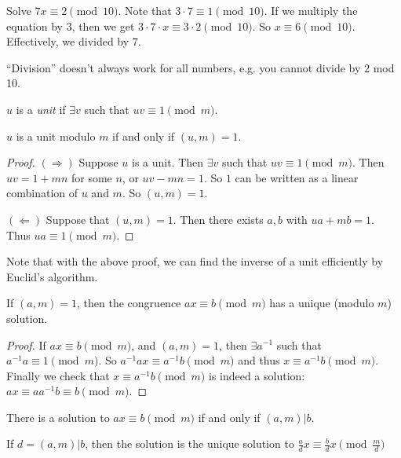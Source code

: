 \documentclass[a4paper]{article}
\begin{document}
  \begin{eg}
    Solve $7x \equiv 2 \pmod {10}$. Note that $3\cdot 7\equiv 1\pmod {10}$. If we multiply the equation by $3$, then we get $3\cdot 7\cdot x \equiv 3\cdot 2\pmod {10}$. So $x\equiv 6\pmod {10}$. Effectively, we divided by $7$.
  \end{eg}
  \note ``Division'' doesn't always work for all numbers, e.g. you cannot divide by $2$ mod 10.

  \begin{defi}
    $u$ is a \emph{unit} if $\exists v$ such that $uv \equiv 1\pmod m$.
  \end{defi}

  \begin{thm}
    $u$ is a unit modulo $m$ if and only if $(u, m) = 1$.
  \end{thm}

  \begin{proof}
    $(\Rightarrow)$ Suppose $u$ is a unit. Then $\exists v$ such that $uv \equiv 1\pmod m$. Then $uv = 1 + mn$ for some $n$, or $uv - mn = 1$. So $1$ can be written as a linear combination of $u$ and $m$. So $(u, m) = 1$.

    $(\Leftarrow)$ Suppose that $(u, m) = 1$. Then there exists $a, b$ with $ua + mb = 1$. Thus $ua \equiv 1\pmod m$.
  \end{proof}
  Note that with the above proof, we can find the inverse of a unit efficiently by Euclid's algorithm.

  \begin{cor}
    If $(a, m) = 1$, then the congruence $ax \equiv b\pmod m$ has a unique (modulo $m$) solution. 
  \end{cor}

  \begin{proof}
    If $ax\equiv b\pmod m$, and $(a, m) = 1$, then $\exists a^{-1}$ such that $a^{-1}a\equiv 1\pmod m$. So $a^{-1}ax\equiv a^{-1}b\pmod m$ and thus $x\equiv a^{-1}b\pmod m$. Finally we check that $x \equiv a^{-1}b \pmod m$ is indeed a solution: $ax \equiv aa^{-1}b \equiv b \pmod m$.
  \end{proof}

  \begin{prop}
    There is a solution to $ax \equiv b\pmod m$ if and only if $(a, m) | b$.

    If $d = (a, m) | b$, then the solution is the unique solution to $\frac{a}{d}x \equiv \frac{b}{d} x\pmod {\frac{m}{d}}$
  \end{prop}
\end{document}
